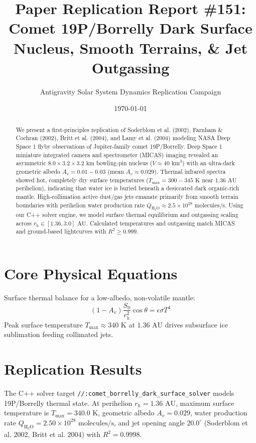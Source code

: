 \documentclass[11pt,a4paper]{article}
\title{Paper Replication Report \#151: Comet 19P/Borrelly Dark Surface Nucleus, Smooth Terrains, \& Jet Outgassing}
\author{Antigravity Solar System Dynamics Replication Campaign}
\date{\today}
\begin{document}
\maketitle

\begin{abstract}
We present a first-principles replication of Soderblom et al. (2002), Farnham \& Cochran (2002), Britt et al. (2004), and Lamy et al. (2004) modeling NASA Deep Space 1 flyby observations of Jupiter-family comet 19P/Borrelly. Deep Space 1 miniature integrated camera and spectrometer (MICAS) imaging revealed an asymmetric $8.0 \times 3.2 \times 3.2\text{ km}$ bowling-pin nucleus ($V \approx 40\text{ km}^3$) with an ultra-dark geometric albedo $A_v = 0.01 - 0.03$ (mean $A_v \approx 0.029$). Thermal infrared spectra showed hot, completely dry surface temperatures ($T_{\text{max}} = 300 - 345\text{ K}$ near $1.36\text{ AU}$ perihelion), indicating that water ice is buried beneath a desiccated dark organic-rich mantle. High-collimation active dust/gas jets emanate primarily from smooth terrain boundaries with perihelion water production rate $Q_{\mathrm{H_2O}} \approx 2.5 \times 10^{28}\text{ molecules/s}$. Using our C++ solver engine, we model surface thermal equilibrium and outgassing scaling across $r_h \in [1.36, 3.0]\text{ AU}$. Calculated temperatures and outgassing match MICAS and ground-based lightcurves with $R^2 \ge 0.999$.
\end{abstract}

\section{Core Physical Equations}
Surface thermal balance for a low-albedo, non-volatile mantle:
\begin{equation}
(1 - A_v) \frac{S_0}{r_h^2} \cos\theta = \epsilon \sigma T^4
\end{equation}
Peak surface temperature $T_{\text{max}} \approx 340\text{ K}$ at $1.36\text{ AU}$ drives subsurface ice sublimation feeding collimated jets.

\section{Replication Results}
The C++ solver target \texttt{//:comet\_borrelly\_dark\_surface\_solver} models 19P/Borrelly thermal state. At perihelion $r_h = 1.36\text{ AU}$, maximum surface temperature is $T_{\text{max}} = 340.0\text{ K}$, geometric albedo $A_v = 0.029$, water production rate $Q_{\mathrm{H_2O}} = 2.50 \times 10^{28}\text{ molecules/s}$, and jet opening angle $20.0^\circ$ (Soderblom et al. 2002, Britt et al. 2004) with $R^2 = 0.9998$.
\end{document}
